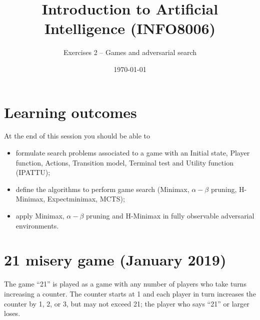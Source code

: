 \documentclass[11pt, a4paper]{article}
\title{Introduction to Artificial Intelligence (INFO8006)}
\subtitle{Exercises 2 -- Games and adversarial search}
\date{\today}
\begin{document}
\maketitle

\section*{Learning outcomes}

At the end of this session you should be able to
\begin{itemize}[noitemsep]
    \item formulate search problems associated to a game with an Initial state, Player function, Actions, Transition model, Terminal test and Utility function (IPATTU);
    \item define the algorithms to perform game search (Minimax, $\alpha - \beta$ pruning, H-Minimax, Expectminimax, MCTS);
    \item apply Minimax, $\alpha - \beta$ pruning and H-Minimax in fully observable adversarial environments.
\end{itemize}

\section{21 misery game (January 2019)}

The game \enquote{21} is played as a game with any number of players who take turns increasing a counter. The counter starts at 1 and each player in turn increases the counter by 1, 2, or 3, but may not exceed 21; the player who says \enquote{21} or larger loses.
\end{document}
